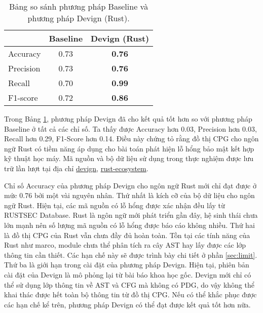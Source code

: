 \begin{table}[H]
    \centering
    \caption{Bảng so sánh phương pháp Baseline và phương pháp Devign (Rust).}
    \label{table:c4_ml}
    \begin{tabular}{l @{\hskip 3cm} c @{\hskip 3cm} c}
        \hline
         & Baseline & \textbf{Devign (Rust)} \\
        \hline
        Accuracy & 0.73 & \textbf{0.76} \\
        Precision & 0.73 & \textbf{0.76} \\
        Recall & 0.70 & \textbf{0.99} \\
        F1-score & 0.72 & \textbf{0.86} \\
        \hline
    \end{tabular}
\end{table}

Trong Bảng \ref{table:c4_ml}, phương pháp Devign đã cho kết quả tốt hơn so với phương pháp Baseline ở tất cả các chỉ số.
Ta thấy được Accuracy hơn 0.03, Precision hơn 0.03, Recall hơn 0.29, F1-Score hơn 0.14.
Điều này chứng tỏ rằng đồ thị CPG cho ngôn ngữ Rust có tiềm năng áp dụng cho bài toán phát hiện lỗ hổng bảo mật kết hợp kỹ thuật học máy.
Mã nguồn và bộ dữ liệu sử dụng trong thực nghiệm được lưu trữ lần lượt tại địa chỉ \href{https://github.com/congnghiahieu/devign}{devign}, \href{https://github.com/congnghiahieu/rust-ecosystem}{rust-ecosystem}.

Chỉ số Accuracy của phương pháp Devign cho ngôn ngữ Rust mới chỉ đạt được ở mức 0.76 bởi một vài nguyên nhân.
Thứ nhất là kích cỡ của bộ dữ liệu cho ngôn ngữ Rust.
Hiện tại, các mã nguồn có lỗ hổng được xác nhận đều lấy từ RUSTSEC Database.
Rust là ngôn ngữ mới phát triển gần đây, hệ sinh thái chưa lớn mạnh nên số lượng mã nguồn có lỗ hổng được báo cáo không nhiều.
Thứ hai là đồ thị CPG của Rust vẫn chưa đầy đủ hoàn toàn.
Tồn tại các tính năng của Rust như marco, module chưa thể phân tích ra cây AST hay lấy được các lớp thông tin cần thiết.
Các hạn chế này sẽ được trình bày chi tiết ở phần \ref{sec:limit}.
Thứ ba là giới hạn trong cài đặt của phương pháp Devign.
Hiện tại, phiên bản cài đặt của Devign là mô phỏng lại từ bài báo khoa học gốc.
Devign mới chỉ có thể sử dụng lớp thông tin về AST và CFG mà không có PDG, do vậy không thể khai thác được hết toàn bộ thông tin từ đồ thị CPG.
Nếu có thể khắc phục được các hạn chế kể trên, phương pháp Devign có thể đạt được kết quả tốt hơn nữa.

